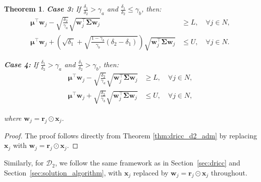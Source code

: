 \documentclass[preprint,12pt,authoryear]{elsarticle}
\newtheorem{theorem}{Theorem}
\begin{document}
\begin{theorem}
\textbf{Case 3:} If $\frac{\delta_1}{\delta_2} > \gamma_a$ and $\frac{\delta_1}{\delta_2} \leqslant \gamma_b$, then:
\begin{align}
\boldsymbol{\mu}^\top \mathbf{w}_j - \sqrt{\frac{\delta_2}{\gamma_a}} \sqrt{\mathbf{w}_j^\top \boldsymbol{\Sigma} \mathbf{w}_j} &\geqslant L, \quad \forall j \in N, \label{eq:improved_balance_d2_case3_lower} \\
\boldsymbol{\mu}^\top \mathbf{w}_j + \left(\sqrt{\delta_1} + \sqrt{\frac{1 - \gamma_b}{\gamma_b} (\delta_2 - \delta_1)}\right) \sqrt{\mathbf{w}_j^\top \boldsymbol{\Sigma} \mathbf{w}_j} &\leqslant U, \quad \forall j \in N. \label{eq:improved_balance_d2_case3_upper}
\end{align}

\textbf{Case 4:} If $\frac{\delta_1}{\delta_2} > \gamma_a$ and $\frac{\delta_1}{\delta_2} > \gamma_b$, then:
\begin{align}
\boldsymbol{\mu}^\top \mathbf{w}_j - \sqrt{\frac{\delta_2}{\gamma_a}} \sqrt{\mathbf{w}_j^\top \boldsymbol{\Sigma} \mathbf{w}_j} &\geqslant L, \quad \forall j \in N, \label{eq:improved_balance_d2_case4_lower} \\
\boldsymbol{\mu}^\top \mathbf{w}_j + \sqrt{\frac{\delta_2}{\gamma_b}} \sqrt{\mathbf{w}_j^\top \boldsymbol{\Sigma} \mathbf{w}_j} &\leqslant U, \quad \forall j \in N, \label{eq:improved_balance_d2_case4_upper}
\end{align}

where $\mathbf{w}_j = \mathbf{r}_j \odot \mathbf{x}_j$.
\end{theorem}

\begin{proof}
The proof follows directly from Theorem \ref{thm:dricc_d2_adm} by replacing $\mathbf{x}_j$ with $\mathbf{w}_j = \mathbf{r}_j \odot \mathbf{x}_j$. 
\end{proof}

Similarly, for $\mathcal{D}_2$, we follow the same framework as in Section~\ref{sec:dricc} and Section~\ref{sec:solution_algorithm}, with $\mathbf{x}_j$ replaced by $\mathbf{w}_j = \mathbf{r}_j \odot \mathbf{x}_j$ throughout.
\end{document}
